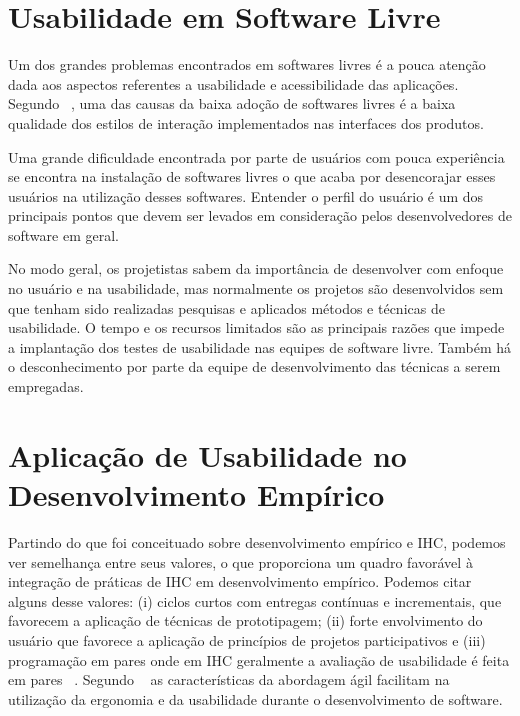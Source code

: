 \newpage

\section{Usabilidade em Software Livre}

Um dos grandes problemas encontrados em softwares livres é a pouca atenção dada aos aspectos referentes a usabilidade e acessibilidade das aplicações. 
%
Segundo ~, uma das causas da baixa adoção de softwares livres é a baixa qualidade dos estilos de interação implementados nas interfaces dos produtos. 

Uma grande dificuldade encontrada por parte de usuários com pouca experiência se encontra na instalação de softwares livres o que acaba por desencorajar esses usuários na utilização desses softwares. Entender o perfil do usuário é um dos principais pontos que devem ser levados em consideração pelos desenvolvedores de software em geral. 

No modo geral, os projetistas sabem da importância de desenvolver com enfoque no usuário e na usabilidade, mas normalmente os projetos são desenvolvidos sem que tenham sido realizadas pesquisas e aplicados métodos e técnicas de usabilidade.
%	
O tempo e os recursos limitados são as principais razões que impede a implantação dos testes de usabilidade nas equipes de software livre. Também há o desconhecimento por parte da equipe de desenvolvimento das técnicas a serem empregadas.
%
\section{Aplicação de Usabilidade no Desenvolvimento Empírico}

	Partindo do que foi conceituado sobre desenvolvimento empírico e IHC, podemos ver semelhança entre seus valores, o que proporciona um quadro favorável à integração de práticas de IHC em desenvolvimento empírico. Podemos citar alguns desse valores: (i) ciclos curtos com entregas contínuas e incrementais, que favorecem a aplicação de técnicas de prototipagem; (ii) forte envolvimento do usuário que favorece a aplicação de princípios de projetos participativos e (iii) programação em pares onde em IHC geralmente a avaliação de usabilidade é feita em pares ~\cite{barbosa2008estrategia}. 
	Segundo ~ as características da abordagem ágil facilitam na utilização da ergonomia e da usabilidade durante o desenvolvimento de software.
		
